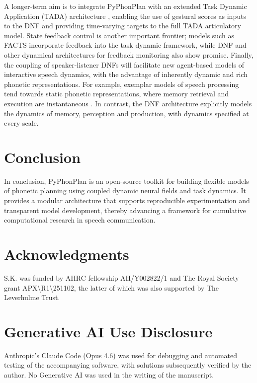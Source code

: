 \documentclass[cameraready]{Interspeech}
\begin{document}
A longer-term aim is to integrate PyPhonPlan with an extended Task Dynamic Application (TADA) architecture \cite{nam-etal2004}, enabling the use of gestural scores as inputs to the DNF and providing time-varying targets to the full TADA articulatory model. State feedback control is another important frontier; models such as FACTS \cite{parrell-etal2019} incorporate feedback into the task dynamic framework, while DNF \cite{chaturvedi-shaw2025} and other dynamical \cite{tilsen2022} architectures for feedback monitoring also show promise. Finally, the coupling of speaker-listener DNFs will facilitate new agent-based models of interactive speech dynamics, with the advantage of inherently dynamic and rich phonetic representations. For example, exemplar models of speech processing tend towards static phonetic representations, where memory retrieval and execution are instantaneous \cite{pierrehumbert2001}. In contrast, the DNF architecture explicitly models the dynamics of memory, perception and production, with dynamics specified at every scale.


\section{Conclusion}

In conclusion, PyPhonPlan is an open-source toolkit for building flexible models of phonetic planning using coupled dynamic neural fields and task dynamics. It provides a modular architecture that supports reproducible experimentation and transparent model development, thereby advancing a framework for cumulative computational research in speech communication.

\section{Acknowledgments}

S.K. was funded by AHRC fellowship AH/Y002822/1 and The Royal Society grant APX\textbackslash R1\textbackslash 251102, the latter of which was also supported by The Leverhulme Trust. 

\section{Generative AI Use Disclosure}

Anthropic's Claude Code (Opus 4.6) was used for debugging and automated testing of the accompanying software, with solutions subsequently verified by the author. No Generative AI was used in the writing of the manuscript.




\end{document}
